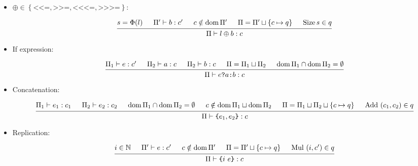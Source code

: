 \documentclass{article}
\DeclareMathOperator{\dom}{dom}
\DeclareMathOperator{\Size}{Size}
\DeclareMathOperator{\Add}{Add}
\DeclareMathOperator{\Mul}{Mul}
\newcommand{\assignShift}{\ensuremath{\left\{
      \texttt{<}\texttt{<=}, \texttt{>>=},
      \texttt{<}\texttt{<}\texttt{<=}, \texttt{>>>=}
    \right\}}}
\begin{document}
\begin{itemize}[leftmargin=*]
    \item $\oplus \in \assignShift$:

          \begin{equation*}
              \begin{prooftree}
                  \hypo{s = \Phi(l)}
                  \hypo{\Pi' \vdash b: c'}
                  \hypo{c \notin \dom \Pi'}
                  \hypo{\Pi = \Pi' \sqcup \left\{c \mapsto q\right\}}
                  \hypo{\Size s \in q}
                  \infer5{\Pi \vdash l \oplus b: c}
              \end{prooftree}
          \end{equation*}


    \item If expression:

          \begin{equation*}
              \begin{prooftree}
                  \hypo{\Pi_1 \vdash e: c'}
                  \hypo{\Pi_2 \vdash a: c}
                  \hypo{\Pi_2 \vdash b: c}
                  \hypo{\Pi = \Pi_1 \sqcup \Pi_2}
                  \hypo{\dom \Pi_1 \cap \dom \Pi_2 = \emptyset}
                  \infer5{\Pi \vdash e \texttt{?} a \texttt{:} b: c}
              \end{prooftree}
          \end{equation*}


    \item Concatenation:

          \begin{equation*}
              \begin{prooftree}
                  \hypo{\Pi_1 \vdash e_1: c_1}
                  \hypo{\Pi_2 \vdash e_2: c_2}
                  \hypo{\dom \Pi_1 \cap \dom \Pi_2 = \emptyset}
                  \hypo{c \notin \dom \Pi_1 \sqcup \dom \Pi_2}
                  \hypo{\Pi = \Pi_1 \sqcup \Pi_2 \sqcup \left\{c \mapsto q\right\}}
                  \hypo{\Add~(c_1, c_2) \in q}
                  \infer6{\Pi \vdash \texttt{\{}e_1, e_2 \texttt{\}}: c}
              \end{prooftree}
          \end{equation*}


    \item Replication:

          \begin{equation*}
              \begin{prooftree}
                  \hypo{i \in \mathbb{N}}
                  \hypo{\Pi' \vdash e: c'}
                  \hypo{c \notin \dom \Pi'}
                  \hypo{\Pi = \Pi' \sqcup \left\{c \mapsto q\right\}}
                  \hypo{\Mul~(i, c') \in q}
                  \infer5{\Pi \vdash \texttt{\{}i~e\texttt{\}}: c}
              \end{prooftree}
          \end{equation*}
\end{itemize}
\end{document}
